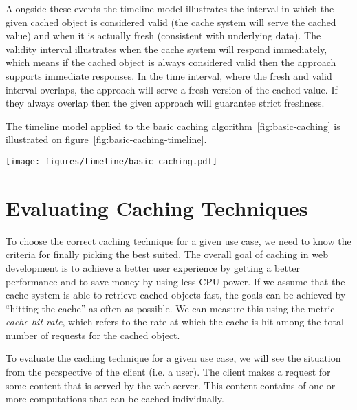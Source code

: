 Alongside these events the timeline model illustrates the interval in which the given cached object is considered valid (the cache system will serve the cached value) and when it is actually fresh (consistent with underlying data). The validity interval illustrates when the cache system will respond immediately, which means if the cached object is always considered valid then the approach supports immediate responses. In the time interval, where the fresh and valid interval overlaps, the approach will serve a fresh version of the cached value. If they always overlap then the given approach will guarantee strict freshness.

The timeline model applied to the basic caching algorithm~\ref{fig:basic-caching} is illustrated on figure~\ref{fig:basic-caching-timeline}.

\begin{figure*}[ht!]
  \centering
  \texttt{[image: figures/timeline/basic-caching.pdf]}
  \caption{The timeline model applied to the basic caching algorithm}
  \label{fig:basic-caching-timeline}
\end{figure*}



\section{Evaluating Caching Techniques}
\label{sec:evaluating_caching_techniques}


To choose the correct caching technique for a given use case, we need to know the criteria for finally picking the best suited. The overall goal of caching in web development is to achieve a better user experience by getting a better performance and to save money by using less CPU power. If we assume that the cache system is able to retrieve cached objects fast, the goals can be achieved by ``hitting the cache'' as often as possible. We can measure this using the metric \emph{cache hit rate}, which refers to the rate at which the cache is hit among the total number of requests for the cached object.



To evaluate the caching technique for a given use case, we will see the situation from the perspective of the client (i.e. a user). The client makes a request for some content that is served by the web server. This content contains of one or more computations that can be cached individually.

